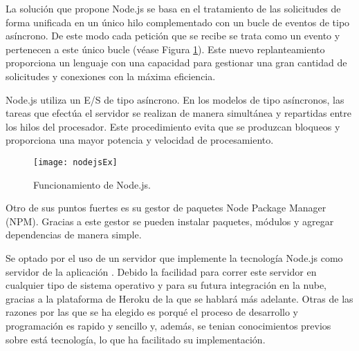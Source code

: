 La solución que propone Node.js se basa en el tratamiento de las solicitudes de forma unificada en un único hilo complementado con un bucle de eventos de tipo asíncrono. De este modo cada petición que se recibe se trata como un evento y pertenecen a este único bucle (véase Figura \ref{fig:nodejsEx}). Este nuevo replanteamiento proporciona un lenguaje con una capacidad para gestionar una gran cantidad de solicitudes y conexiones con la máxima eficiencia.

Node.js utiliza un E/S de tipo asíncrono. En los modelos de tipo asíncronos, las tareas que efectúa el servidor se realizan de manera simultánea y repartidas entre los hilos del procesador. Este procedimiento evita que se produzcan bloqueos y proporciona una mayor potencia y velocidad de procesamiento.

     
\begin{figure}[h]
    \centering
    \texttt{[image: nodejsEx]}
    \caption{Funcionamiento de Node.js.}
    \label{fig:nodejsEx}
\end{figure}




Otro de sus puntos fuertes es su gestor de paquetes Node Package Manager  (NPM). Gracias a este gestor se pueden instalar paquetes, módulos y agregar dependencias de manera simple.

Se optado por el uso de un servidor que implemente la tecnología Node.js como servidor de la aplicación \ULLAR{}. Debido la facilidad  para correr este servidor en cualquier tipo de sistema operativo y para su futura integración en la nube, gracias a la plataforma de Heroku de la que se hablará más adelante. Otras de las razones por las que se ha elegido es porqué el proceso de desarrollo y programación es rapido y sencillo y, además, se tenian conocimientos previos sobre está tecnología, lo que ha facilitado su implementación.


